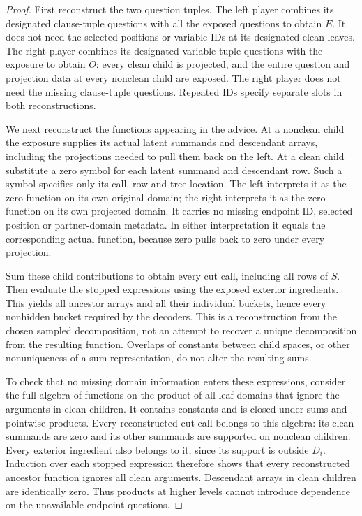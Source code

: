\begin{proof}
First reconstruct the two question tuples.  The left player combines
its designated clause-tuple questions with all the exposed questions
to obtain $E$.  It does not need the selected positions or variable
IDs at its designated clean leaves.  The right player combines its
designated variable-tuple questions with the exposure to obtain $O$:
every clean child is projected, and the entire question and projection
data at every nonclean child are exposed.  The right player does not
need the missing clause-tuple questions.  Repeated IDs specify
separate slots in both reconstructions.

We next reconstruct the functions appearing in the advice.  At a
nonclean child the exposure supplies its actual latent summands and
descendant arrays, including the projections needed to pull them
back on the left.  At a clean child substitute a zero symbol for
each latent summand and descendant row.  Such a symbol specifies
only its call, row and tree location.  The left interprets it as the
zero function on its own original domain; the right interprets it
as the zero function on its own projected domain.  It carries no
missing endpoint ID, selected position or partner-domain metadata.
In either interpretation it equals the corresponding actual
function, because zero pulls back to zero under every projection.

Sum these child contributions to obtain every cut call, including
all rows of $S$.  Then evaluate the stopped expressions using the
exposed exterior ingredients.  This yields all ancestor arrays and
all their individual buckets, hence every nonhidden bucket required
by the decoders.  This is a reconstruction from the chosen sampled
decomposition, not an attempt to recover a unique decomposition from
the resulting function.  Overlaps of constants between child
spaces, or other nonuniqueness of a sum representation, do not
alter the resulting sums.

To check that no missing domain information enters these expressions,
consider the full algebra of functions on the product of all leaf
domains that ignore the arguments in clean children.  It contains
constants and is closed under sums and pointwise products.  Every
reconstructed cut call belongs to this algebra: its clean summands
are zero and its other summands are supported on nonclean children.
Every exterior ingredient also belongs to it, since its support is
outside $D_i$.  Induction over each stopped expression therefore
shows that every reconstructed ancestor function ignores all clean
arguments.  Descendant arrays in clean children are identically
zero.  Thus products at higher levels cannot introduce dependence
on the unavailable endpoint questions.


\end{proof}
